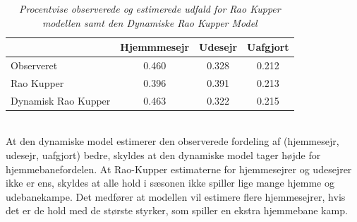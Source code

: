 \documentclass[11pt,a4paper]{article}
\begin{document}
\begin{table}[htb!]
\centering
\begin{adjustbox}{max width=\textwidth}
\begin{tabular}{|l|ccc|}
\hline 
 & Hjemmmesejr & Udesejr & Uafgjort \\
 \hline
Observeret & 0.460 & 0.328 & 0.212\\
Rao Kupper & 0.396 & 0.391 & 0.213\\
Dynamisk Rao Kupper & 0.463 & 0.322 & 0.215\\
   \hline   
\end{tabular} 
\end{adjustbox}
\caption{\label{tab:HjemmeUdeProcenter}\textit{Procentvise observerede og estimerede udfald for Rao Kupper modellen samt den Dynamiske Rao Kupper Model}}
\end{table}\\
At den dynamiske model estimerer den observerede fordeling af (hjemmesejr, udesejr, uafgjort) bedre, skyldes at den dynamiske model tager højde for hjemmebanefordelen. At Rao-Kupper estimaterne for hjemmesejrer og udesejrer ikke er ens, skyldes at alle hold i sæsonen ikke spiller lige mange hjemme og udebanekampe. Det medfører at modellen vil estimere flere hjemmesejrer, hvis det er de hold med de største styrker, som spiller en ekstra hjemmebane kamp. 
\end{document}
